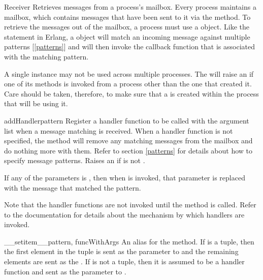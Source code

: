 \documentclass{howto}
\begin{document}
\begin{classdesc}{Receiver}{}
Retrieves messages from a process's mailbox. Every process maintains a mailbox,
which contains messages that have been sent to it via the 
method. To retrieve the messages out of the mailbox, a process must use a
 object. Like the  statement in Erlang, a
 object will match an incoming message against multiple patterns
[\ref{patterns}] and will then invoke the callback function that is associated
with the matching pattern.

A single  instance may not be used across multiple processes.
The  will raise an  if one of its
methods is invoked from a process other than the one that created it. Care
should be taken, therefore, to make sure that a  is created
within the process that will be using it.

\begin{methoddesc}{addHandler}{pattern}
Register a handler function  to be called with the  argument
list when a message matching  is received. When a handler function
 is not specified, the  method will remove any
matching messages from the mailbox and do nothing more with them. Refer to
section \ref{patterns} for details about how to specify message patterns. Raises
an  if  is not .

If any of the  parameters is , then when
 is invoked, that parameter is replaced with the message that matched
the pattern.

Note that the handler functions are not invoked until the 
method is called. Refer to the  documentation for details
about the mechanism by which handlers are invoked.
\end{methoddesc}

\begin{methoddesc}{__setitem__}{pattern, funcWithArgs}
An alias for the  method. If  is a tuple,
then the first element in the tuple is sent as the  parameter to
 and the remaining elements are sent as the . If
 is not a tuple, then it is assumed to be a handler function
and sent as the  parameter to .


\end{methoddesc}
\end{classdesc}
\end{document}
